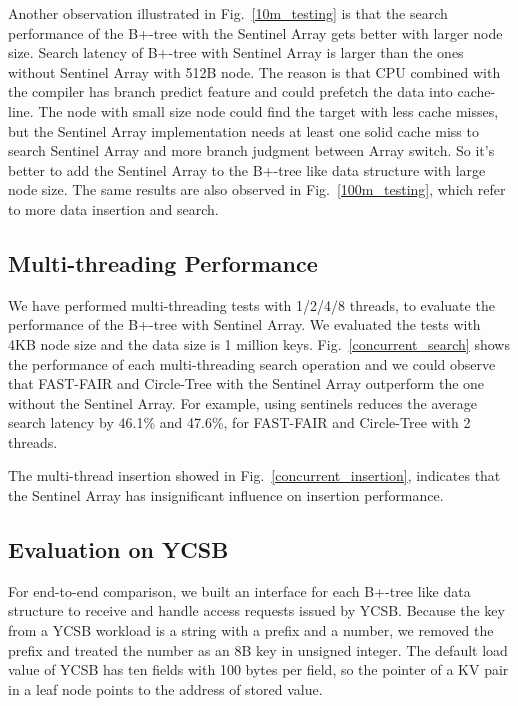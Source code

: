 Another observation illustrated in Fig.~\ref{10m_testing} is that the search performance of the B+-tree with the Sentinel Array gets better with larger node size. Search latency of B+-tree with Sentinel Array is larger than the ones without Sentinel Array with 512B node. The reason is that CPU combined with the compiler has branch predict feature and could prefetch the data into cache-line. The node with small size node could find the target with less cache misses, but the Sentinel Array implementation needs at least one solid cache miss to search Sentinel Array and more branch judgment between Array switch. So it's better to add the Sentinel Array to the B+-tree like data structure with large node size. The same results are also observed in Fig.~\ref{100m_testing}, which refer to more data insertion and search.




\subsection{Multi-threading Performance}

We have performed multi-threading tests with 1/2/4/8 threads, to evaluate the performance of the B+-tree with Sentinel Array. We evaluated the tests with 4KB node size and the data size is 1 million keys. Fig.~\ref{concurrent_search} shows the performance of each multi-threading search operation and we could observe that FAST-FAIR and Circle-Tree with the Sentinel Array outperform the one without the Sentinel Array. For example, using sentinels reduces the average search latency by 46.1\% and 47.6\%, for FAST-FAIR and Circle-Tree with 2 threads.

The multi-thread insertion showed in Fig.~\ref{concurrent_insertion}, indicates that the Sentinel Array has insignificant influence on insertion performance. 


\subsection{Evaluation on YCSB}




For end-to-end comparison, we built an interface for each B+-tree like data structure to receive and handle access requests issued by YCSB. Because the key from a YCSB workload is a string with a prefix and a number, we removed the prefix and treated the number as an 8B key in unsigned integer. The default load value of YCSB has ten fields with 100 bytes per field, so the pointer of a KV pair in a leaf node points to the address of stored value.

